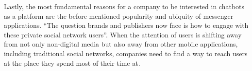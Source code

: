 Lastly, the most fundamental reasons for a company to be interested in chatbots as a platform are the before mentioned popularity and ubiquity of messenger applications.
``The question brands and publishers now face is how to engage with these private social network users''\cite{drum}.
When the attention of users is shifting away from not only non-digital media but also away from other mobile applications, including traditional social networks, companies need to find a way to reach users at the place they spend most of their time at.


